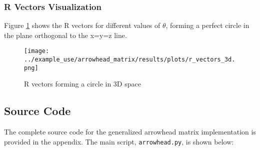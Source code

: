 \subsubsection{R Vectors Visualization}

Figure \ref{fig:r_vectors_3d_gen} shows the R vectors for different values of $\theta$, forming a perfect circle in the plane orthogonal to the x=y=z line.

\begin{figure}[H]
    \centering
    \texttt{[image: ../example\_use/arrowhead\_matrix/results/plots/r\_vectors\_3d.png]}
    \caption{R vectors forming a circle in 3D space}
    \label{fig:r_vectors_3d_gen}
\end{figure}

\subsection{Source Code}

The complete source code for the generalized arrowhead matrix implementation is provided in the appendix. The main script, \texttt{arrowhead.py}, is shown below:

